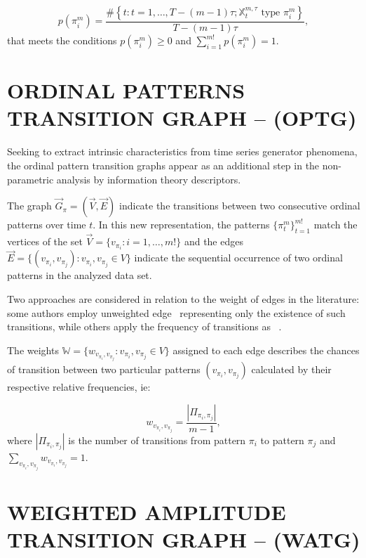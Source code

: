 \documentclass{isprs}
\begin{document}
\begin{equation}
	p(\pi_i^m) = \frac{\#\left \{t : t = 1, \dots, T-(m-1)\tau; \mathbb{X}_t^{m,\tau} \text{ type } \pi_i^m\right \}}{T- (m-1)\tau},  
\end{equation}
that meets the conditions $p(\pi_i^m) \ge 0$ and  $\sum_{i=1}^{m!} p(\pi_i^m) = 1$.
	
\section{ORDINAL PATTERNS TRANSITION GRAPH -- (OPTG)}\label{OPTG}
	
Seeking to extract intrinsic characteristics from time series generator phenomena, the ordinal pattern transition graphs appear as an additional step in the non-parametric analysis by information theory descriptors.
	
The graph $\vec{G}_{\pi} = (\vec{V}, \vec{E})$ indicate the transitions between two consecutive ordinal patterns over time $t$.
In this new representation, the patterns $\{\pi_t^m \}_{t = 1}^{m!}$ match the vertices of the set $\vec{V} = \{v_{\pi_i}: i = 1, \dots, m! \}$ and the edges $\vec{E} = \{(v_{\pi_i}, v_{\pi_j}): v_{\pi_i}, v_{\pi_j} \in V \}$ indicate the sequential occurrence of two ordinal patterns in the analyzed data set.
	
Two approaches are considered in relation to the weight of edges in the literature: some authors employ unweighted edge~\citep{McCullough2015lagged, Kulp2016ordinal} representing only the existence of such transitions, while others apply the frequency of transitions as ~\citep{Sorrentino2015periodic, Zhang2017ConstructingOP}.
	
The weights $\mathbb{W} = \{w_{v_{\pi_i}, v_{\pi_j}}: v_{\pi_i}, v_{\pi_j} \in V \}$ assigned to each edge describes the chances of transition between two particular patterns $(v_{\pi_i}, v_{\pi_j})$ calculated by their respective relative frequencies, ie:	

\begin{equation}
	w_{v_{\pi_i}, v_{\pi_j}} = \frac{|\Pi_{\pi_i,\pi_j}|}{m-1},
\end{equation}
where $|\Pi_{\pi_i,\pi_j}|$ is the number of transitions from pattern $\pi_i$ to pattern $\pi_j$ and $\sum_{v_{\pi_i}, v_{\pi_j}}w_{v_{\pi_i}, v_{\pi_j}} = 1$.
	
\section{WEIGHTED AMPLITUDE TRANSITION GRAPH -- (WATG)}\label{WATG}
	
\end{document}
